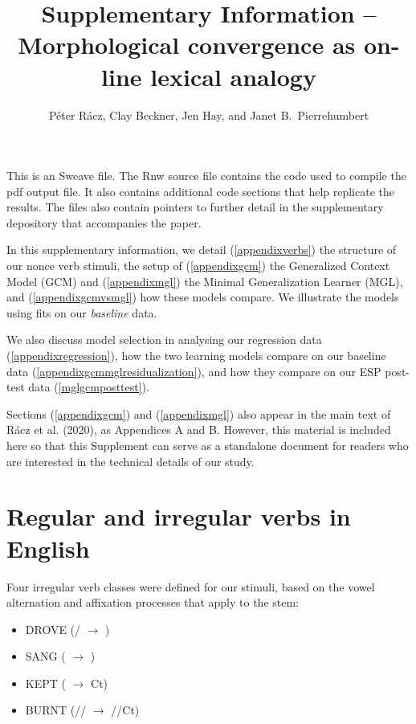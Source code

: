 \documentclass[12pt]{article}
\title{Supplementary Information -- Morphological convergence as on-line lexical analogy}
\author{P\'eter R\'acz, Clay Beckner, Jen Hay, and Janet B.\ Pierrehumbert}
\begin{document}



\maketitle

\noindent This is an Sweave file. The Rnw source file contains the code used to compile the pdf output file. It also contains additional code sections that help replicate the results. The files also contain pointers to further detail in the supplementary depository that accompanies the paper. 

\noindent In this supplementary information, we detail (\ref{appendixverbs}) the structure of our nonce verb stimuli, the setup of (\ref{appendixgcm}) the Generalized Context Model (GCM) and (\ref{appendixmgl}) the Minimal Generalization Learner (MGL), and (\ref{appendixgcmvsmgl}) how these models compare. 
We illustrate the models using fits on our \emph {baseline} data. 

We also discuss model selection in analysing our regression data (\ref{appendixregression}), how the two learning models compare on our baseline data (\ref{appendixgcmmglresidualization}), and how they compare on our ESP post-test data (\ref{mglgcmposttest}). 

Sections (\ref{appendixgcm}) and (\ref{appendixmgl}) also appear in the main text of  R\'acz et al. (2020), as Appendices A and B. However, this material is included here so that this Supplement can serve as a standalone document for readers who are interested in the technical details of our study. 

\section{Regular and irregular verbs in English \label{appendixverbs}}

Four irregular verb classes were defined for our stimuli, based on the vowel alternation and affixation processes that apply to the stem:

\begin{itemize}
    \item DROVE (\textipa{[aI]}/\textipa{[i]} $\rightarrow{}$ \textipa{[oU]})
    \item SANG (\textipa{[I]} $\rightarrow{}$ \textipa{[\ae]})
    \item KEPT (\textipa{[i]} $\rightarrow{}$ \textipa{[E]}Ct)
    \item BURNT (\textipa{[3]}/\textipa{[E]}/\textipa{[I]} $\rightarrow{}$ \textipa{[3]}/\textipa{[E]}/\textipa{[I]}Ct)
\end{itemize}
\end{document}
